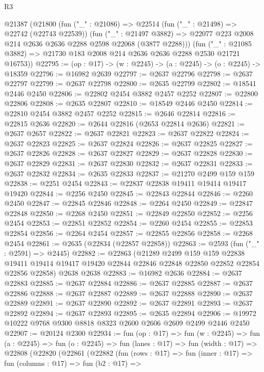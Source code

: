 \begin{lexlean}{R3}
\begin{coremodule}
  @21387
    (@21800
      (fun ("_" : @21086) =>
      @22514
        (fun ("_" : @21498) => @22742 (@22743 @22539))
        (fun ("_" : @21497 @3882) =>
        @22077 @223 @2008 @214 @2636 @2636 @2288 @2598 @22068 (@3877 @2288)))
      (fun ("_" : @21085 @3882) => @21730 @183 @2008 @214 @2636 @2636 @2288 @2530 @21721 @16753))
@22795 := (op : @17) -> (w : @2245) -> (a : @2245) -> (o : @2245) -> @18359
@22796 := @16982 @2639
@22797 := @2637 @22796
@22798 := @2637 @22797
@22799 := @2637 @22798
@22800 := @2635 @22799
@22802 := @18541 @2446 @2450
@22806 := @22802 @2454 @3882 @2457 @2252
@22807 := @22800 @22806
@22808 := @2635 @22807
@22810 := @18549 @2446 @2450
@22814 := @22810 @2454 @3882 @2457 @2252
@22815 := @2646 @22814
@22816 := @22815 @2636
@22820 := @2644 @22816 (@2653 @22814 @2636)
@22821 := @2637 @2657
@22822 := @2637 @22821
@22823 := @2637 @22822
@22824 := @2637 @22823
@22825 := @2637 @22824
@22826 := @2637 @22825
@22827 := @2637 @22826
@22828 := @2637 @22827
@22829 := @2637 @22828
@22830 := @2637 @22829
@22831 := @2637 @22830
@22832 := @2637 @22831
@22833 := @2637 @22832
@22834 := @2635 @22833
@22837 := @21270 @2499 @159 @159
@22838 := @2251 @2454
@22843 := @22837 @22838 @19411 @19414 @19417 @19420
@22844 := @2256 @2450
@22845 := @22843 @22844
@22846 := @2260 @2450
@22847 := @22845 @22846
@22848 := @2264 @2450
@22849 := @22847 @22848
@22850 := @2268 @2450
@22851 := @22849 @22850
@22852 := @2256 @2454
@22853 := @22851 @22852
@22854 := @2260 @2454
@22855 := @22853 @22854
@22856 := @2264 @2454
@22857 := @22855 @22856
@22858 := @2268 @2454
@22861 := @2635 (@22834 (@22857 @22858))
@22863 := @2593 (fun ("_" : @2591) => @2445)
@22882 := @22863
    (@21289
      @2499
      @159
      @159
      @22838
      @19411
      @19414
      @19417
      @19420
      @22844
      @22846
      @22848
      @22850
      @22852
      @22854
      @22856
      @22858)
    @2638
    @2638
@22883 := @16982 @2636
@22884 := @2637 @22883
@22885 := @2637 @22884
@22886 := @2637 @22885
@22887 := @2637 @22886
@22888 := @2637 @22887
@22889 := @2637 @22888
@22890 := @2637 @22889
@22891 := @2637 @22890
@22892 := @2637 @22891
@22893 := @2637 @22892
@22894 := @2637 @22893
@22895 := @2635 @22894
@22906 := @19972 @10222 @9768 @9300 @8818 @8323 @2600 @2606 @2609 @2499 @2446 @2450
@22907 := @20124 @2300
@22934 := fun (op : @17) =>
  fun (w : @2245) =>
  fun (a : @2245) =>
  fun (o : @2245) =>
  fun (lanes : @17) =>
  fun (width : @17) =>
  @22808
    (@22820
      (@22861
        (@22882
          (fun (rows : @17) =>
          fun (inner : @17) =>
          fun (columns : @17) =>
          fun (b2 : @17) =>

\end{coremodule}
\end{lexlean}

